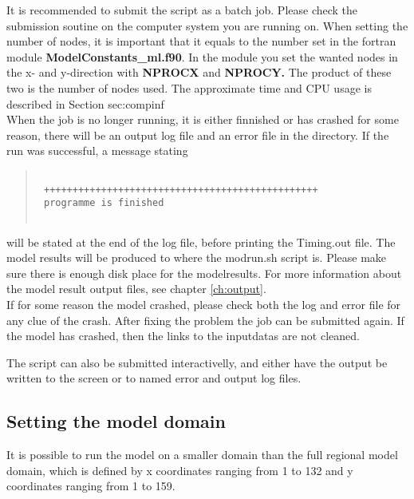 It is recommended to submit the script as a batch job. Please check the submission soutine 
on the computer system you are running on. 
When setting the number of nodes, it is important that it equals to the number set in the fortran module 
{\bf ModelConstants\_ml.f90}. In the module you set the wanted nodes in the x- and y-direction with {\bf NPROCX } and 
{\bf NPROCY.} The product of these two is the number of nodes used. 
The approximate time and CPU usage is described in Section {sec:compinf}\\

When the job is no longer running, it is either finnished or has crashed for some reason, 
there will be an output log file and an error file in the directory. 
If the run was successful, a message stating 
\begin{quote}
\begin{verbatim}

 ++++++++++++++++++++++++++++++++++++++++++++++++
 programme is finished


\end{verbatim}
\end{quote}
will be stated at the end of the log file, before printing the Timing.out file.   
The model results will be produced to where the modrun.sh script is. Please make 
sure there is enough disk place for the modelresults. 
For more information about the model result output files, see chapter \ref{ch:output}.\\

If for some reason the model crashed, please check both the log and error file for any 
clue of the crash. After fixing the problem the job can be submitted again. If the 
model has crashed, then the links to the inputdatas are not cleaned. 

The script can also be submitted interactivelly, and either have the output be written to the screen or to 
named error and output log files. 
 


\subsection{Setting the model domain}

It is possible to run the model on a smaller domain than the full
regional model domain, which is defined by  x coordinates ranging
from 1 to 132 and y coordinates ranging from 1 to 159. 

